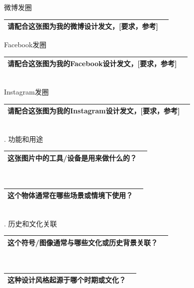 \documentclass[12pt]{book}
\begin{document}
\bigskip
微博发圈

\begin{tabular}{|p{15cm}|p{3cm}|}
	\hline
请配合这张图为我的微博设计发文，[要求，参考]\\
	\hline
\end{tabular}



\bigskip
Facebook发圈

\begin{tabular}{|p{15cm}|p{3cm}|}
	\hline
请配合这张图为我的Facebook设计发文，[要求，参考]\\
	\hline
\end{tabular}\\




\bigskip
Instagram发圈

\begin{tabular}{|p{15cm}|p{3cm}|}
	\hline
请配合这张图为我的Instagram设计发文，[要求，参考]\\
	\hline
\end{tabular}\\



. 功能和用途

\begin{tabular}{|p{15cm}|p{3cm}|}
	\hline
这张图片中的工具/设备是用来做什么的？\\
	\hline
\end{tabular}\\



\begin{tabular}{|p{15cm}|p{3cm}|}
	\hline
这个物体通常在哪些场景或情境下使用？\\
	\hline
\end{tabular}\\



. 历史和文化关联

\begin{tabular}{|p{15cm}|p{3cm}|}
	\hline
这个符号/图像通常与哪些文化或历史背景关联？\\
	\hline
\end{tabular}\\



\begin{tabular}{|p{15cm}|p{3cm}|}
	\hline
这种设计风格起源于哪个时期或文化？\\
	\hline
\end{tabular}\\
\end{document}
